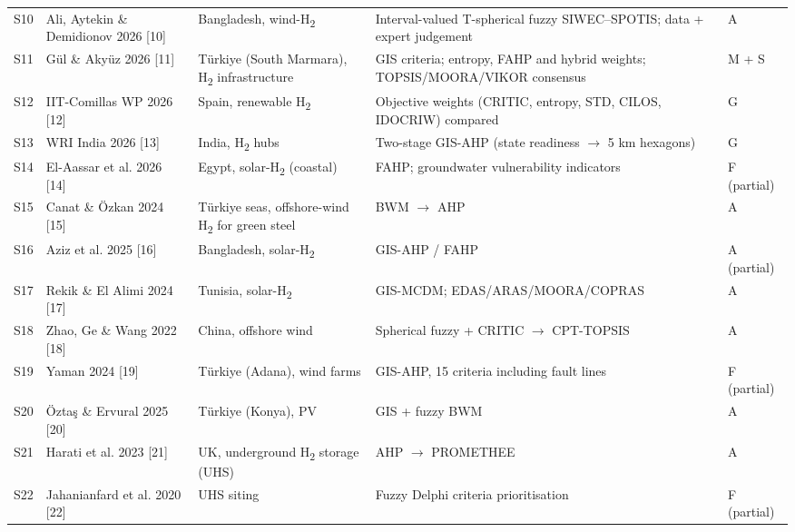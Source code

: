 \documentclass[11pt,a4paper]{article}
\begin{document}
{\begin{longtable}{l>{\raggedright\arraybackslash}p{2.28cm}>{\raggedright\arraybackslash}p{2.84cm}>{\raggedright\arraybackslash}p{6.94cm}>{\raggedright\arraybackslash}p{1.51cm}}
S10 & Ali, Aytekin \& Demidionov 2026 [10] & Bangladesh, wind-H\textsubscript{2} & Interval-valued T-spherical fuzzy SIWEC--SPOTIS; data + expert judgement & A \\
S11 & Gül \& Akyüz 2026 [11] & Türkiye (South Marmara), H\textsubscript{2} infrastructure & 13 GIS criteria; entropy, FAHP and hybrid weights; TOPSIS/\allowbreak{}MOORA/\allowbreak{}VIKOR consensus & M + S \\
S12 & IIT-Comillas WP 2026 [12] & Spain, renewable H\textsubscript{2} & Objective weights (CRITIC, entropy, STD, CILOS, IDOCRIW) compared & G \\
S13 & WRI India 2026 [13] & India, H\textsubscript{2} hubs & Two-stage GIS-AHP (state readiness $\rightarrow$ 5 km hexagons) & G \\
S14 & El-Aassar et al. 2026 [14] & Egypt, solar-H\textsubscript{2} (coastal) & FAHP; groundwater vulnerability indicators & F (partial) \\
S15 & Canat \& Özkan 2024 [15] & Türkiye seas, offshore-wind H\textsubscript{2} for green steel & BWM $\rightarrow$ AHP & A \\
S16 & Aziz et al. 2025 [16] & Bangladesh, solar-H\textsubscript{2} & GIS-AHP /\allowbreak{} FAHP & A (partial) \\
S17 & Rekik \& El Alimi 2024 [17] & Tunisia, solar-H\textsubscript{2} & GIS-MCDM; EDAS/\allowbreak{}ARAS/\allowbreak{}MOORA/\allowbreak{}COPRAS & A \\
S18 & Zhao, Ge \& Wang 2022 [18] & China, offshore wind & Spherical fuzzy + CRITIC $\rightarrow$ CPT-TOPSIS & A \\
S19 & Yaman 2024 [19] & Türkiye (Adana), wind farms & GIS-AHP, 15 criteria including fault lines & F (partial) \\
S20 & Öztaş \& Ervural 2025 [20] & Türkiye (Konya), PV & GIS + fuzzy BWM & A \\
S21 & Harati et al. 2023 [21] & UK, underground H\textsubscript{2} storage (UHS) & AHP $\rightarrow$ PROMETHEE & A \\
S22 & Jahanianfard et al. 2020 [22] & UHS siting & Fuzzy Delphi criteria prioritisation & F (partial) \\
\end{longtable}
}
\end{document}
